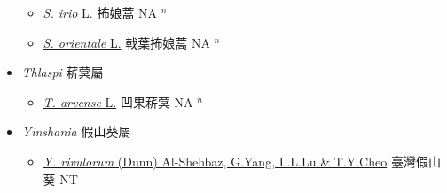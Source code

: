 \begin{itemize}
  \begin{itemize}
        \item[] \href{http://www.theplantlist.org/tpl1.1/search?q=Sisymbrium+irio}{\textit{S. irio} L.}   抪娘蒿 NA $^n$
        \item[] \href{http://www.theplantlist.org/tpl1.1/search?q=Sisymbrium+orientale}{\textit{S. orientale} L.}   戟葉抪娘蒿 NA $^n$
  \end{itemize}
 \item[] \textit{Thlaspi} 菥蓂屬
                    
  \begin{itemize}
        \item[] \href{http://www.theplantlist.org/tpl1.1/search?q=Thlaspi+arvense}{\textit{T. arvense} L.}   凹果菥蓂 NA $^n$
  \end{itemize}
 \item[] \textit{Yinshania} 假山葵屬
                    
  \begin{itemize}
        \item[] \href{http://www.theplantlist.org/tpl1.1/search?q=Yinshania+rivulorum}{\textit{Y. rivulorum} (Dunn) Al-Shehbaz, G.Yang, L.L.Lu \& T.Y.Cheo}     臺灣假山葵 NT
  \end{itemize}
  \end{itemize}
